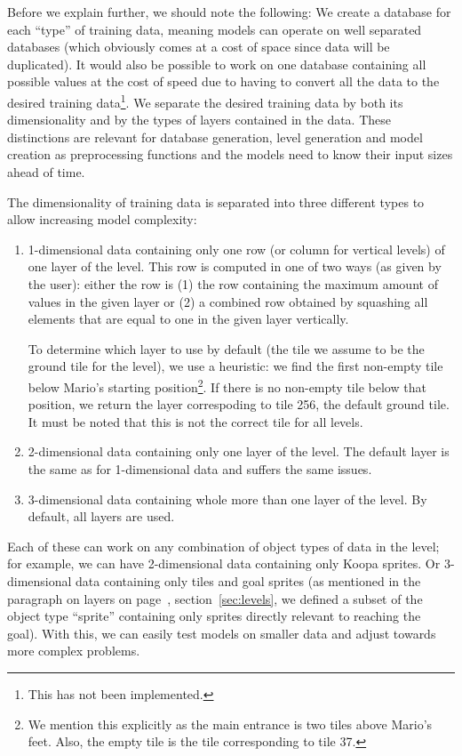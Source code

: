 Before we explain further, we should note the following: We create a
database for each ``type'' of training data, meaning models can
operate on well separated databases (which obviously comes at a cost
of space since data will be duplicated). It would also be possible to
work on one database containing all possible values at the cost of
speed due to having to convert all the data to the desired training
data\footnote{This has not been implemented.}. We separate the desired
training data by both its dimensionality and by the types of layers
contained in the data. These distinctions are relevant for database
generation, level generation and model creation as preprocessing
functions and the models need to know their input sizes ahead of time.

The dimensionality of training data is separated into three different
types to allow increasing model complexity:
\begin{enumerate}
\item 1-dimensional data containing only one row (or column for
  vertical levels) of one layer of the level. This row is computed in
  one of two ways (as given by the user): either the row is (1) the
  row containing the maximum amount of values in the given layer or
  (2) a combined row obtained by squashing all elements that are equal
  to one in the given layer vertically.

  To determine which layer to use by default (the tile we assume to be
  the ground tile for the level), we use a heuristic: we find the
  first non-empty tile below Mario's starting position\footnote{We
    mention this explicitly as the main entrance is two tiles above
    Mario's feet. Also, the empty tile is the tile corresponding to
    tile 37.}. If there is no non-empty tile below that position, we
  return the layer correspoding
  to tile 256, the default ground tile. \\
  It must be noted that this is not the correct tile for all levels.
\item 2-dimensional data containing only one layer of the level. The
  default layer is the same as for 1-dimensional data and suffers the
  same issues.
\item 3-dimensional data containing whole more than one layer of the
  level. By default, all layers are used.
\end{enumerate}

Each of these can work on any combination of object types of data in
the level; for example, we can have 2-dimensional data containing only
Koopa sprites. Or 3-dimensional data containing only tiles and goal
sprites (as mentioned in the paragraph on layers on
page~\pageref{par:layers}, section~\ref{sec:levels}, we defined a
subset of the object type ``sprite'' containing only sprites directly
relevant to reaching the goal). With this, we can easily test models
on smaller data and adjust towards more complex problems.

